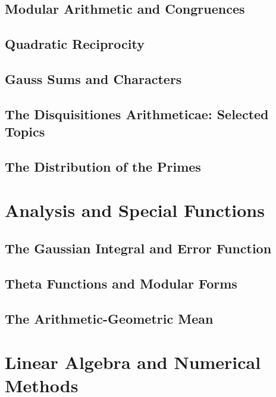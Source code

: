 \documentclass[12pt,oneside]{book}
\begin{document}
\chapter{Modular Arithmetic and Congruences}
\label{ch:modular}


\chapter{Quadratic Reciprocity}
\label{ch:quadratic}


\chapter{Gauss Sums and Characters}
\label{ch:gauss-sums}


\chapter{The Disquisitiones Arithmeticae: Selected Topics}
\label{ch:disquisitiones}


\chapter{The Distribution of the Primes}
\label{ch:prime-counting}


\part{Analysis and Special Functions}

\chapter{The Gaussian Integral and Error Function}
\label{ch:gaussian-integral}


\chapter{Theta Functions and Modular Forms}
\label{ch:theta}


\chapter{The Arithmetic-Geometric Mean}
\label{ch:agm}


\part{Linear Algebra and Numerical Methods}
\end{document}
